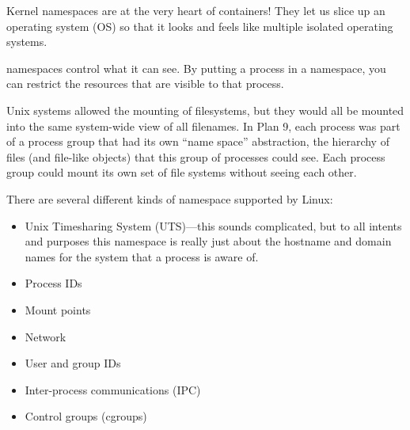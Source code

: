 
Kernel namespaces are at the very heart of containers! They let us slice up an operating system (OS) so that it looks and feels like multiple isolated operating systems.

namespaces control what it can see. By putting a process in a namespace, you can restrict the resources that are visible to that process.

Unix systems allowed the mounting of filesystems, but they would all be mounted into the same system-wide view of all filenames. In Plan 9, each process was part of a process group that had its own “name space” abstraction, the hierarchy of files (and file-like objects) that this group of processes could see. Each process group could mount its own set of file systems without seeing each other.

There are several different kinds of namespace supported by Linux:
\begin{itemize}
    \item Unix Timesharing System (UTS)—this sounds complicated, but to all intents and purposes this namespace is really just about the hostname and domain names for the system that a process is aware of.
    \item Process IDs
    \item Mount points
    \item Network
    \item User and group IDs
    \item Inter-process communications (IPC)
    \item  Control groups (cgroups)
\end{itemize}

